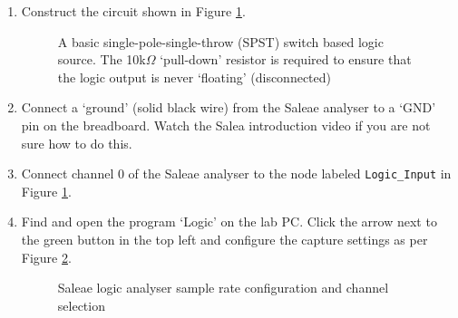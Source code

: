 \documentclass{UoNMCHA}
\numberwithin{equation}{section}
\begin{document}
\begin{enumerate}
    \item Construct the circuit shown in Figure \ref{fig:swsch}.
    
    \begin{figure}[H]
    \caption{A basic single-pole-single-throw (SPST) switch based logic source. The 10k$\Omega$ `pull-down' resistor is required to ensure that the logic output is never `floating' (disconnected)}
    \label{fig:swsch}
    \end{figure}
    
    \item  Connect a `ground' (solid black wire) from the Saleae analyser to a `GND' pin on the breadboard. Watch the Salea introduction video if you are not sure how to do this.
    
    \item Connect channel 0 of the Saleae analyser to the node labeled \texttt{Logic\_Input} in Figure \ref{fig:swsch}. 
    
    \item Find and open the program `Logic' on the lab PC. Click the arrow next to the green button in the top left and configure the capture settings as per Figure \ref{fig:logicsettings}.
    
    \begin{figure}[H]
    \caption{Saleae logic analyser sample rate configuration and channel selection}
    \label{fig:logicsettings}
    \end{figure}
    

\end{enumerate}
\end{document}
